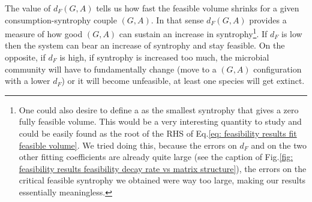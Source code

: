 \documentclass[12pt, titlepage]{report}
\begin{document}
  The value of $d_F(G,A)$ tells us how fast the feasible volume shrinks for a given consumption-syntrophy couple $(G,A)$. In that sense $d_F(G,A)$ provides a measure of how good $(G,A)$ can sustain an increase in syntrophy\footnote{One could also desire to define a  as the smallest syntrophy that gives a zero fully feasible volume. This would be a very interesting quantity to study and could be easily found as the root of the RHS of Eq.\eqref{eq: feasibility results fit feasible volume}. We tried doing this, because the errors on $d_F$ and on the two other fitting coefficients are already quite large (see the caption of Fig.\ref{fig: feasibility results feasibility decay rate vs matrix structure}), the errors on the critical feasible syntrophy we obtained were way too large, making our results essentially meaningless.}. If $d_F$ is low then the system can bear an increase of syntrophy and stay feasible. On the opposite, if $d_F$ is high, if syntrophy is increased too much, the microbial community will have to fundamentally change (\eg move to a $(G,A)$ configuration with a lower $d_F$) or it will become unfeasible, \ie at least one species will get extinct.
\end{document}
